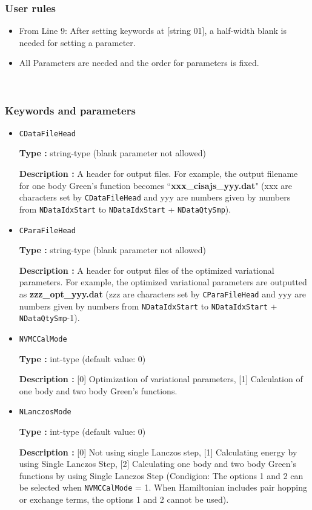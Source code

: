 \subsubsection{User rules}
\begin{itemize}
\item From Line 9: After setting keywords at [string 01], a half-width blank is needed for setting a parameter.
\item All Parameters are needed and the order for parameters is fixed.
\end{itemize}

~\subsubsection{Keywords and parameters}
 \begin{itemize}
  \item  \verb|CDataFileHead|

 {\bf Type :} string-type (blank parameter not allowed)

{\bf Description :} A header for output files. For example, the output filename for one body Green's function becomes ``{\bf xxx\_cisajs\_yyy.dat}" (xxx are characters set by \verb|CDataFileHead| and yyy are numbers given by numbers from \verb|NDataIdxStart| to \verb|NDataIdxStart| +  \verb|NDataQtySmp|). 

 \item  \verb|CParaFileHead|

 {\bf Type :} string-type (blank parameter not allowed)

{\bf Description :}  A header for output files of the optimized variational parameters. For example, the optimized variational parameters are outputted as  {\bf zzz\_opt\_yyy.dat} (zzz are characters set by \verb|CParaFileHead| and yyy are numbers given by numbers from \verb|NDataIdxStart| to \verb|NDataIdxStart| +  \verb|NDataQtySmp|-1).
 
 
 \item  \verb|NVMCCalMode|

 {\bf Type :} int-type (default value: 0)

{\bf Description :} [0] Optimization of variational parameters, [1] Calculation of one body and two body Green's functions.

 \item  \verb|NLanczosMode|

 {\bf Type :} int-type (default value: 0)

{\bf Description :} [0] Not using single Lanczos step, [1] Calculating energy by using Single Lanczos Step, [2] Calculating one body and two body Green's functions by using Single Lanczos Step (Condigion: The options 1 and 2 can be selected when \verb|NVMCCalMode| = 1. When Hamiltonian includes  pair hopping or exchange terms, the options 1 and 2 cannot be used).
 

\end{itemize}
